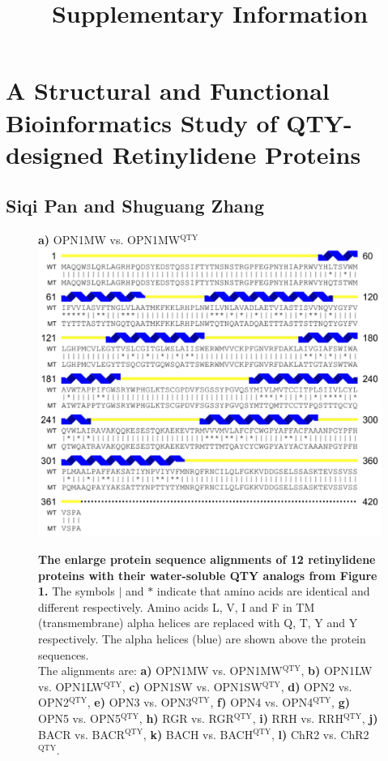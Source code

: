 \documentclass[fleqn,12pt]{supp}
\title{Supplementary Information}
\author{}
\begin{document}
\flushbottom
\maketitle

\vspace{-35pt}
\section*{A Structural and Functional Bioinformatics Study of QTY-designed Retinylidene Proteins}

\subsection*{Siqi Pan and Shuguang Zhang}

\begin{figure}[H]
    \label{tb:sequence}
    \caption{\textbf{The enlarge protein sequence alignments of 12 retinylidene proteins with their water-soluble QTY analogs from Figure 1.} The symbols $|$ and $*$ indicate that amino acids are identical and different respectively. Amino acids L, V, I and F in TM (transmembrane) alpha helices are replaced with Q, T, Y and Y respectively. The alpha helices (blue) are shown above the protein sequences. \\
    The alignments are: 
    \textbf{a)} OPN1MW vs. OPN1MW$^{\textrm{QTY}}$, 
    \textbf{b)} OPN1LW vs. OPN1LW$^{\textrm{QTY}}$, 
    \textbf{c)} OPN1SW vs. OPN1SW$^{\textrm{QTY}}$, 
    \textbf{d)} OPN2 vs. OPN2$^{\textrm{QTY}}$, 
    \textbf{e)} OPN3 vs. OPN3$^{\textrm{QTY}}$, 
    \textbf{f)} OPN4 vs. OPN4$^{\textrm{QTY}}$, 
    \textbf{g)} OPN5 vs. OPN5$^{\textrm{QTY}}$, 
    \textbf{h)} RGR vs. RGR$^{\textrm{QTY}}$, 
    \textbf{i)} RRH vs. RRH$^{\textrm{QTY}}$, 
    \textbf{j)} BACR vs. BACR$^{\textrm{QTY}}$, 
    \textbf{k)} BACH vs. BACH$^{\textrm{QTY}}$, 
    \textbf{l)} ChR2 vs. ChR2$^{\textrm{QTY}}$. }
    \textbf{a)} OPN1MW vs. OPN1MW$^{\textrm{QTY}}$ \\
    \includegraphics[width=\linewidth]{SuppFigures/opn1mw.jpg}
\end{figure}
\end{document}
